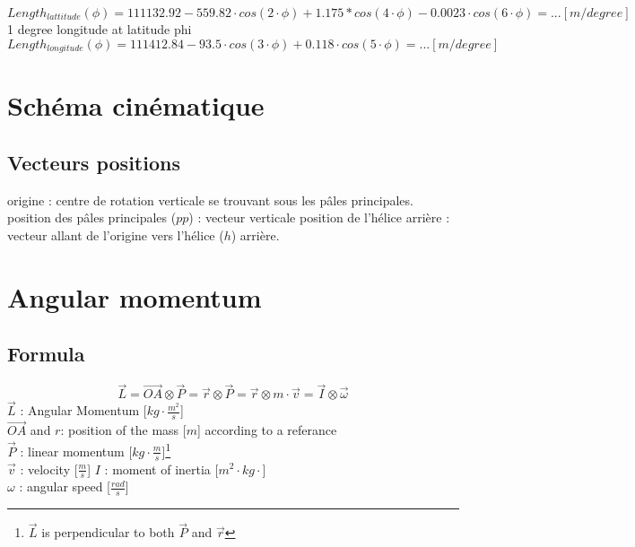 \documentclass[12pt,a4paper]{article}
\begin{document}
\begin{equation}
    Length_{lattitude}(\phi) = 111132.92-559.82 \cdot cos(2 \cdot \phi)+1.175*cos(4 \cdot \phi)-0.0023 \cdot cos(6 \cdot \phi)= ... [m/degree]
\end{equation}
1 degree longitude at latitude phi
\begin{equation}
    Length_{longitude}(\phi) =
    111412.84-93.5 \cdot cos(3 \cdot \phi)+ 0.118 \cdot cos(5 \cdot \phi)= ... [m/degree]
\end{equation}

\newpage
\section{Schéma cinématique}


\subsection{Vecteurs positions}
origine : centre de rotation verticale se trouvant sous les pâles principales.
\medbreak
position  des pâles principales ($pp$) : vecteur verticale
\medbreak
position de l'hélice arrière :
vecteur allant de l'origine vers l'hélice ($h$) arrière.


\newpage
\section{Angular momentum}

\subsection{Formula}
\begin{equation}
    \vec{L}=\vec{OA} \otimes \vec{P}=\vec{r} \otimes \vec{P}=\vec{r} \otimes m \cdot \vec{v}=\vec{I} \otimes \vec{\omega}
\end{equation}
$\vec{L}$ : Angular Momentum [$kg \cdot \frac{m^2}{s}$]\\
$\vec{OA}$ and $r$: position of the mass [$m$] according to a referance\\
$\vec{P}$ : linear momentum [$kg\cdot \frac{m}{s}$]\footnote{$\vec{L}$ is perpendicular to both $\vec{P}$ and $\vec{r}$}\\
$\vec{v}$ : velocity [$\frac{m}{s}$]
$I$ : moment of inertia [$m^2 \cdot kg \cdot$]\\
$\omega$ : angular speed [$\frac{rad}{s}$]
\end{document}
